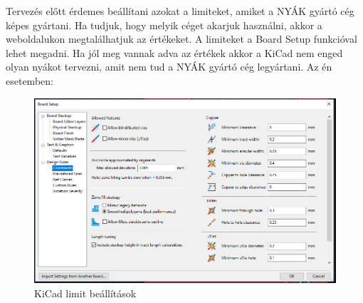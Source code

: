 \documentclass[a4paper,12pt,oneside]{book}
\begin{document}
Tervezés előtt érdemes beállítani azokat a limiteket, amiket a NYÁK gyártó cég képes gyártani. Ha tudjuk, hogy melyik céget akarjuk használni, akkor a weboldalukon megtalálhatjuk az értékeket. A limiteket a Board Setup funkcióval lehet megadni. Ha jól meg vannak adva az értékek akkor a KiCad nem enged olyan nyákot tervezni, amit nem tud a NYÁK gyártó cég legyártani. Az én esetemben:
\begin{figure}[H]
	\centering
	\includegraphics[trim=1mm 1mm 1mm 1mm,scale=0.55]{bosrd limits.PNG}
	\caption{KiCad limit beállítások}
	\label{KiCad limit beállítások}
\end{figure}
\end{document}
